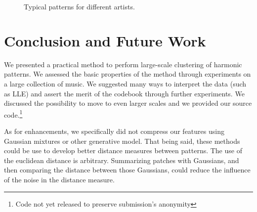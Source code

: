 \documentclass{article}
\begin{document}
\begin{figure}[htb]
  \centering
  \hspace{5mm}                
  \vspace{2mm}
  \caption{\small{Typical patterns for different artists.}}
  \label{fig:typicalpat}
\end{figure}



\section{Conclusion and Future Work}
We presented a practical method to perform large-scale clustering of
harmonic patterns. We assessed the basic properties of the method through
experiments on a large collection of music. We suggested many ways
to interpret the data (such as LLE) and assert the merit of the codebook
through further experiments.
We discussed the possibility to move to even larger scales
and we provided our source code.\footnote{Code not yet released to preserve
submission's anonymity}

As for enhancements, we specifically did not compress our features using
Gaussian mixtures or other generative model. That being said, these methods
could be use to develop better distance measures between patterns.
The use of the euclidean distance is arbitrary. Summarizing patches
with Gaussians, and then comparing the distance between those Gaussians,
could reduce the influence of the noise in the distance measure.
\end{document}
